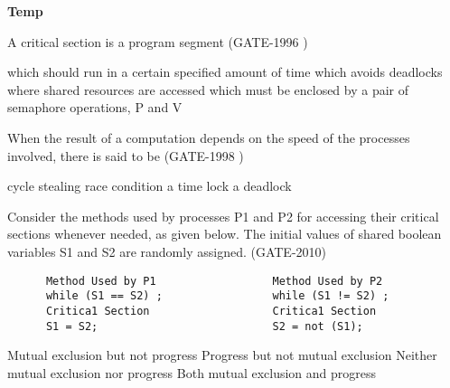 \centerline{\textbf{ \LARGE Temp}}

\setcounter{question}{0}





\begin{minipage}{\linewidth}

  \question  A critical section is a program segment (GATE-1996 )

  \begin{choices}
    \choice which should run in a certain specified amount of time
    \choice which avoids deadlocks
    \choice where shared resources are accessed
    \choice which must be enclosed by a pair of semaphore operations, P and V
  \end{choices}

  \end{minipage}

\vspace{0.08in}


\begin{minipage}{\linewidth}

  \question  When the result of a computation depends on the speed of the processes involved, there is said to be
             (GATE-1998 )

  \begin{oneparchoices}
    \choice cycle stealing
    \choice race condition
    \choice a time lock
    \choice a deadlock
  \end{oneparchoices}

  \end{minipage}

\vspace{0.08in}


\begin{minipage}{\linewidth}

  \question  Consider the methods used by processes P1 and P2 for accessing their critical sections whenever needed, as given below. The initial values of shared boolean variables S1 and S2 are randomly assigned. (GATE-2010)

  \begin{lstlisting}
      Method Used by P1                  Method Used by P2
      while (S1 == S2) ;                 while (S1 != S2) ;
      Critica1 Section                   Critica1 Section
      S1 = S2;                           S2 = not (S1);
  \end{lstlisting}

  \begin{choices}
    \choice Mutual exclusion but not progress
    \choice Progress but not mutual exclusion
    \choice Neither mutual exclusion nor progress
    \choice Both mutual exclusion and progress
  \end{choices}

  \end{minipage}

